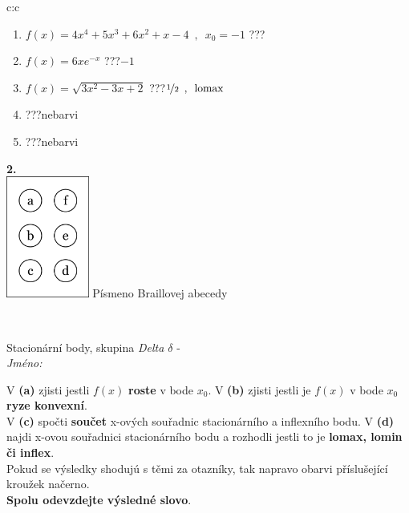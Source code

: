 \documentclass[10pt]{report}
\begin{document}
\begin{tabular}{c:c}
\begin{minipage}[c][104.5mm][t]{0.5\linewidth}
\begin{center}
\begin{minipage}{0.79\linewidth}
\begin{center}
\begin{varwidth}{\linewidth}
\begin{enumerate}
\item $f(x)=4x^4+5x^3+6x^2+x-4\enspace , \enspace x_0=-1$\quad \dotfill\; ???\;\dotfill \quad {}
\item $f(x)=6xe^{-x}$\quad \dotfill\; ???\;\dotfill \quad $-1$
\item $f(x)=\sqrt{3x^2-3x+2}$\quad \dotfill\; ???\;\dotfill \quad $\nicefrac{1}{2}\enspace , \enspace\mathrm{lomax}$
\item \quad \dotfill\; ???\;\dotfill \quad nebarvi
\item \quad \dotfill\; ???\;\dotfill \quad nebarvi
\end{enumerate}
\end{varwidth}
\end{center}
\end{minipage}
\begin{minipage}{0.20\linewidth}
\begin{center}
{\Huge\bfseries 2.} \\[2mm]
\includegraphics[height=40mm]{../images/braille.png}
{\small Písmeno Braillovej abecedy}
\end{center}
\end{minipage}
\end{center}
\end{minipage}
\\ \hdashline
\begin{minipage}[c][104.5mm][t]{0.5\linewidth}
\begin{center}
\vspace{7mm}
{\huge Stacionární body, skupina \textit{Delta $\delta$} -}\\[5mm]
\textit{Jméno:}\phantom{xxxxxxxxxxxxxxxxxxxxxxxxxxxxxxxxxxxxxxxxxxxxxxxxxxxxxxxxxxxxxxxxx}\\[5mm]
\begin{minipage}{0.95\linewidth}
\begin{center}
{\small V \textbf{(a)} zjisti jestli $f(x)$ \textbf{roste} v bode $x_0$. V \textbf{(b)} zjisti jestli je $f(x)$ v bode $x_0$ \textbf{ryze konvexní}.\\V \textbf{(c)} spočti \textbf{součet} x-ových souřadnic stacionárního a inflexního bodu. V \textbf{(d)} najdi x-ovou souřadnici stacionárního bodu a rozhodli jestli to je \textbf{lomax, lomin či inflex}.\\Pokud se výsledky shodujú s těmi za otazníky, tak napravo obarvi příslušející kroužek načerno.\\\textbf{Spolu odevzdejte výsledné slovo}}.

\end{center}
\end{minipage}
\end{center}
\end{minipage}
\end{tabular}
\end{document}
